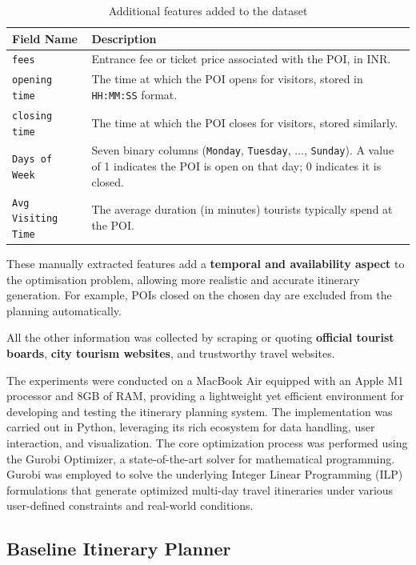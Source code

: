 \documentclass[sigconf,authordraft]{acmart}
\begin{document}
\begin{table}[H]
\centering
\begin{tabularx}{0.5\textwidth}{p{3cm} X}
\toprule
\textbf{Field Name} & \textbf{Description} \\
\midrule
\texttt{fees} & Entrance fee or ticket price associated with the POI, in INR. \\
\midrule
\texttt{opening time} & The time at which the POI opens for visitors, stored in \texttt{HH:MM:SS} format. \\
\midrule
\texttt{closing time} & The time at which the POI closes for visitors, stored similarly. \\
\midrule
\texttt{Days of Week} & Seven binary columns (\texttt{Monday}, \texttt{Tuesday}, ..., \texttt{Sunday}). A value of 1 indicates the POI is open on that day; 0 indicates it is closed. \\
\midrule
\texttt{Avg Visiting Time} & The average duration (in minutes) tourists typically spend at the POI. \\
\bottomrule
\end{tabularx}
\caption{Additional features added to the dataset}
\end{table}

These manually extracted features add a \textbf{temporal and availability aspect} to the optimisation problem, allowing more realistic and accurate itinerary generation. For example, POIs closed on the chosen day are excluded from the planning automatically.

All the other information was collected by scraping or quoting \textbf{official tourist boards}, \textbf{city tourism websites}, and trustworthy travel websites.

The experiments were conducted on a MacBook Air equipped with an Apple M1 processor and 8GB of RAM, providing a lightweight yet efficient environment for developing and testing the itinerary planning system. The implementation was carried out in Python, leveraging its rich ecosystem for data handling, user interaction, and visualization. The core optimization process was performed using the Gurobi Optimizer, a state-of-the-art solver for mathematical programming. Gurobi was employed to solve the underlying Integer Linear Programming (ILP) formulations that generate optimized multi-day travel itineraries under various user-defined constraints and real-world conditions.

\subsection{Baseline Itinerary Planner}
\end{document}
